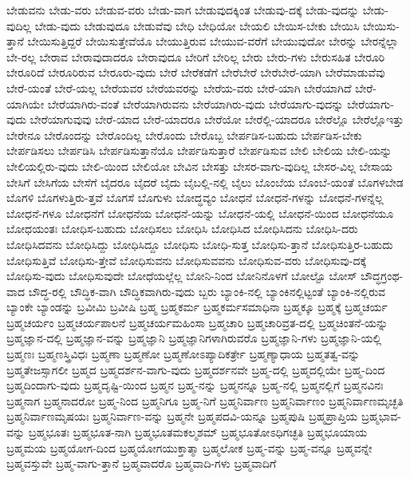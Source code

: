 {ಬೇಡುವನು
ಬೇಡು-ವರು
ಬೇಡುವ-ವರು
ಬೇಡು-ವಾಗ
ಬೇಡುವುದಕ್ಕಿಂತ
ಬೇಡುವು-ದಕ್ಕೆ
ಬೇಡು-ವುದನ್ನು
ಬೇಡು-ವುದಿಲ್ಲ
ಬೇಡು-ವುದು
ಬೇಡುವುದೂ
ಬೇಡುವೆವು
ಬೇಧಿ
ಬೇಧಿಯೋ
ಬೇಯಲಿ
ಬೇಯಿಸ-ಬೇಕು
ಬೇಯಿಸಿ
ಬೇಯಿಸು-ತ್ತಾನೆ
ಬೇಯಿಸುತ್ತಿದ್ದರೆ
ಬೇಯಿಸುತ್ತೇವೆಯೊ
ಬೇಯುತ್ತಿರುವ
ಬೇಯುವ-ವರೆಗೆ
ಬೇಯುವುದೋ
ಬೇರನ್ನು
ಬೇರನ್ನೆಲ್ಲಾ
ಬೇ-ರಲ್ಲ
ಬೇರಾವ
ಬೇರಾವುದಾದರೂ
ಬೇರಾವುದೂ
ಬೇರಿಗೆ
ಬೇರಿಲ್ಲ
ಬೇರು
ಬೇರು-ಗಳು
ಬೇರುಸಹಿತ
ಬೇರೂರಿ
ಬೇರೂರಿದೆ
ಬೇರೂರಿರುವ
ಬೇರೂರು-ವುದು
ಬೇರೆ
ಬೇರೆಕಡೆಗೆ
ಬೇರೆಬೇರೆ
ಬೇರೆಬೇರೆ-ಯಾಗಿ
ಬೇರೆಮಾಡುವೆವು
ಬೇರೆ-ಯಂತೆ
ಬೇರೆ-ಯಲ್ಲ
ಬೇರೆಯವರ
ಬೇರೆಯವರನ್ನು
ಬೇರೆಯ-ವರು
ಬೇರೆ-ಯಾಗಿ
ಬೇರೆಯಾಗಿದೆ
ಬೇರೆ-ಯಾಗಿಯೇ
ಬೇರೆಯಾಗಿರು-ವಂತೆ
ಬೇರೆಯಾಗಿರುವನು
ಬೇರೆಯಾಗಿರು-ವುದು
ಬೇರೆಯಾಗು-ವುದನ್ನು
ಬೇರೆಯಾಗು-ವುದು
ಬೇರೆಯಾಗುವುವು
ಬೇರೆ-ಯಾದ
ಬೇರೆ-ಯಾದರೂ
ಬೇರೆಯೋ
ಬೇರೆಲ್ಲಿ-ಯಾದರೂ
ಬೇರೆಲ್ಲೊ
ಬೇರೆಲ್ಲೊಇತ್ತು
ಬೇರೇನೂ
ಬೇರೊಂದನ್ನು
ಬೇರೊಂದಿಲ್ಲ
ಬೇರೊಂದು
ಬೇರೊಬ್ಬ
ಬೇರ್ಪಡಿಸ-ಬಹುದು
ಬೇರ್ಪಡಿಸ-ಬೇಕು
ಬೇರ್ಪಡಿಸಲು
ಬೇರ್ಪಡಿಸಿ
ಬೇರ್ಪಡಿಸುತ್ತಾನೆಯೊ
ಬೇರ್ಪಡಿಸುತ್ತಾರೆ
ಬೇರ್ಪಡಿಸುವ
ಬೇಲಿ
ಬೇಲಿಯ
ಬೇಲಿ-ಯನ್ನು
ಬೇಲಿಯಲ್ಲಿರು-ವುದು
ಬೇಲಿ-ಯಿಂದ
ಬೇಲಿಯೋ
ಬೇವಿನ
ಬೇಸತ್ತು
ಬೇಸರ-ವಾಗು-ವುದಿಲ್ಲ
ಬೇಸರ-ವಿಲ್ಲ
ಬೇಸಾಯ
ಬೇಸಿಗೆ
ಬೇಸಿಗೆಯ
ಬೇಸೆಗೆ
ಬೈದರೂ
ಬೈದರೆ
ಬೈದು
ಬೈಬಲ್ಲಿ-ನಲ್ಲಿ
ಬೈಲು
ಬೊಂಬೆಯ
ಬೊಂಬೆ-ಯಂತೆ
ಬೊಗಳಬೇಡ
ಬೊಗಳಿ
ಬೊಗಳುತ್ತಿರು-ತ್ತವೆ
ಬೊಗಸೆ
ಬೊಗುಳು
ಬೋದ್ಧವ್ಯಂ
ಬೋಧನೆ
ಬೋಧನೆ-ಗಳನ್ನು
ಬೋಧನೆ-ಗಳನ್ನೆಲ್ಲ
ಬೋಧನೆ-ಗಳೂ
ಬೋಧನೆಗೆ
ಬೋಧನೆಯ
ಬೋಧನೆ-ಯನ್ನು
ಬೋಧನೆ-ಯಲ್ಲಿ
ಬೋಧನೆ-ಯಿಂದ
ಬೋಧನೆಯೂ
ಬೋಧಯಂತಃ
ಬೋಧಿಸ-ಬಹುದು
ಬೋಧಿಸಲು
ಬೋಧಿಸಿ
ಬೋಧಿಸಿದ
ಬೋಧಿಸಿದನು
ಬೋಧಿಸಿ-ದರು
ಬೋಧಿಸಿದವನು
ಬೋಧಿಸಿದ್ದು
ಬೋಧಿಸಿದ್ದೂ
ಬೋಧಿಸು
ಬೋಧಿ-ಸುತ್ತ
ಬೋಧಿಸು-ತ್ತಾನೆ
ಬೋಧಿಸುತ್ತಿರ-ಬಹುದು
ಬೋಧಿಸುತ್ತಿವೆ
ಬೋಧಿಸು-ತ್ತೇವೆ
ಬೋಧಿಸುವನು
ಬೋಧಿಸುವವನು
ಬೋಧಿಸುವ-ವರು
ಬೋಧಿಸುವು-ದಕ್ಕೆ
ಬೋಧಿಸು-ವುದು
ಬೋಧಿಸುವುದೇ
ಬೋಧೆಯಲ್ಲೆಲ್ಲ
ಬೋನಿ-ನಿಂದ
ಬೋನಿನೊಳಗೆ
ಬೋಲ್ಟೊ
ಬೋಸ್
ಬೌದ್ಧಗ್ರಂಥ-ವಾದ
ಬೌದ್ಧ-ರಲ್ಲಿ
ಬೌದ್ಧಿಕ-ವಾಗಿ
ಬೌದ್ಧಿಕವಾಗಿರು-ವುದು
ಬ್ಬರು
ಬ್ಯಾಂಕಿ-ನಲ್ಲಿ
ಬ್ಯಾಂಕಿನಲ್ಲಿಟ್ಟಂತೆ
ಬ್ಯಾಂಕಿ-ನಲ್ಲಿರುವ
ಬ್ಯಾಂಕೇ
ಬ್ಯಾಂಡನ್ನು
ಬ್ರವೀಮಿ
ಬ್ರವೀಷಿ
ಬ್ರಹ್ಮ
ಬ್ರಹ್ಮಕರ್ಮ
ಬ್ರಹ್ಮಕರ್ಮಸಮಾಧಿನಾ
ಬ್ರಹ್ಮಕ್ಕೂ
ಬ್ರಹ್ಮಕ್ಕೆ
ಬ್ರಹ್ಮಚರ್ಯ
ಬ್ರಹ್ಮಚರ್ಯಂ
ಬ್ರಹ್ಮಚರ್ಯಪಾಲನೆ
ಬ್ರಹ್ಮಚರ್ಯಮಹಿಂಸಾ
ಬ್ರಹ್ಮಚಾರಿ
ಬ್ರಹ್ಮಚಾರಿವ್ರತ-ದಲ್ಲಿ
ಬ್ರಹ್ಮಚಿಂತನೆ-ಯನ್ನು
ಬ್ರಹ್ಮಜ್ಞಾನ-ದಲ್ಲಿ
ಬ್ರಹ್ಮಜ್ಞಾನ-ವನ್ನು
ಬ್ರಹ್ಮಜ್ಞಾನಿ
ಬ್ರಹ್ಮಜ್ಞಾನಿಗಳಾಗಿರುವರೊ
ಬ್ರಹ್ಮಜ್ಞಾನಿ-ಗಳು
ಬ್ರಹ್ಮಜ್ಞಾನಿ-ಯಲ್ಲಿ
ಬ್ರಹ್ಮಣಃ
ಬ್ರಹ್ಮಣಸ್ತ್ರಿವಿಧಃ
ಬ್ರಹ್ಮಣಾ
ಬ್ರಹ್ಮಣೋ
ಬ್ರಹ್ಮಣೋಽಪ್ಯಾದಿಕರ್ತ್ರೇ
ಬ್ರಹ್ಮಣ್ಯಾಧಾಯ
ಬ್ರಹ್ಮತತ್ವ-ವನ್ನು
ಬ್ರಹ್ಮತೇಜಸ್ಸಾಗಲೀ
ಬ್ರಹ್ಮದ
ಬ್ರಹ್ಮದರ್ಶನ-ವಾಗು-ವುದು
ಬ್ರಹ್ಮದರ್ಶನವೇ
ಬ್ರಹ್ಮ-ದಲ್ಲಿ
ಬ್ರಹ್ಮದಲ್ಲಿಯೇ
ಬ್ರಹ್ಮ-ದಿಂದ
ಬ್ರಹ್ಮದಿಂದಾಗು-ವುದು
ಬ್ರಹ್ಮದೃಷ್ಟಿ-ಯಿಂದ
ಬ್ರಹ್ಮನ
ಬ್ರಹ್ಮ-ನನ್ನು
ಬ್ರಹ್ಮನನ್ನೂ
ಬ್ರಹ್ಮ-ನಲ್ಲಿ
ಬ್ರಹ್ಮನಲ್ಲಿಗೆ
ಬ್ರಹ್ಮನವಿನಃ
ಬ್ರಹ್ಮನಾಗ
ಬ್ರಹ್ಮನಾದರೋ
ಬ್ರಹ್ಮ-ನಿಂದ
ಬ್ರಹ್ಮನಿಗೂ
ಬ್ರಹ್ಮ-ನಿಗೆ
ಬ್ರಹ್ಮನಿರ್ವಾಣ
ಬ್ರಹ್ಮನಿರ್ವಾಣಂ
ಬ್ರಹ್ಮನಿರ್ವಾಣಮೃಚ್ಛತಿ
ಬ್ರಹ್ಮನಿರ್ವಾಣಮೃಷಯಃ
ಬ್ರಹ್ಮನಿರ್ವಾಣ-ವನ್ನು
ಬ್ರಹ್ಮನೇ
ಬ್ರಹ್ಮಪದವಿ-ಯನ್ನೂ
ಬ್ರಹ್ಮಪುಷಿ
ಬ್ರಹ್ಮಪ್ರಾಪ್ತಿಯ
ಬ್ರಹ್ಮಭಾವ-ವನ್ನು
ಬ್ರಹ್ಮಭೂತಃ
ಬ್ರಹ್ಮಭೂತ-ನಾಗಿ
ಬ್ರಹ್ಮಭೂತಮಕಲ್ಮಶಮ್
ಬ್ರಹ್ಮಭೂತೋಽಧಿಗಚ್ಛತಿ
ಬ್ರಹ್ಮಭೂಯಾಯ
ಬ್ರಹ್ಮಮಯ
ಬ್ರಹ್ಮಯೋಗ-ದಿಂದ
ಬ್ರಹ್ಮಯೋಗಯುಕ್ತಾತ್ಮಾ
ಬ್ರಹ್ಮಲೋಕ
ಬ್ರಹ್ಮ-ವನ್ನು
ಬ್ರಹ್ಮ-ವನ್ನೂ
ಬ್ರಹ್ಮವನ್ನೇ
ಬ್ರಹ್ಮವಸ್ತುವೇ
ಬ್ರಹ್ಮ-ವಾಗು-ತ್ತಾನೆ
ಬ್ರಹ್ಮವಾದರೊ
ಬ್ರಹ್ಮವಾದಿ-ಗಳು
ಬ್ರಹ್ಮವಾದಿಗೆ
}
